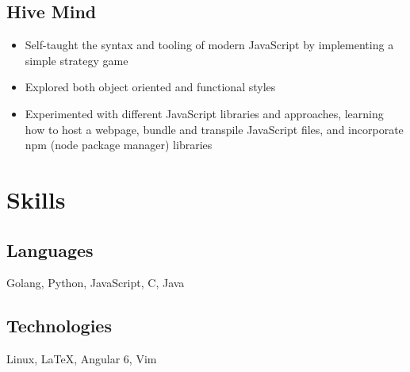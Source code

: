 \documentclass[11pt]{article}
\begin{document}
\subsection{Hive Mind}
\begin{itemize}
	\item Self-taught the syntax and tooling of modern JavaScript by implementing a simple strategy game 
	\item Explored both object oriented and functional styles 
	\item Experimented with different JavaScript libraries and approaches, learning how to host a webpage, bundle and transpile JavaScript files, and incorporate npm (node package manager) libraries  
\end{itemize}



\section{Skills}
\begin{minipage}{20em}
	\subsection{Languages}
		Golang, Python, JavaScript, C, Java
\end{minipage}
\begin{minipage}{25em}
	\subsection{Technologies}
	Linux, \LaTeX , Angular 6, Vim 	
\end{minipage}
\end{document}
